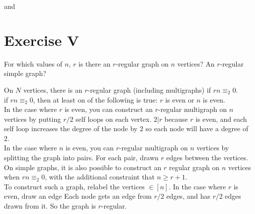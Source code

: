 \documentclass[fontsize=11pt]{scrartcl} %
\numberwithin{equation}{section} %
\numberwithin{figure}{section} %
\numberwithin{table}{section} %
\begin{document}
			and 
			
			

\section*{Exercise V}
 For which values of $n$, $r$ is there an $r$-regular graph on $n$ vertices? An
	$r$-regular simple graph?
	
	On $N$ vertices, there is an $r$-regular graph (including multigraphs) if $rn \equiv_2 0$.  \\
	
	if $rn \equiv_2 0$, then at least on of the following is true: $r$ is even or $n$ is even.  \\
	
	In the case where $r$ is even, you can construct an $r$-regular multigraph on $n$ vertices by putting $r/2$ self loops on each vertex.  $2|r$ because $r$ is even, and each self loop increases the degree of the node by $2$ so each node will have a degree of $2$.  \\
	
	In the case where $n$ is even, you can $r$-regular multigraph on $n$ vertices by splitting the graph into pairs.  For each pair, drawn $r$ edges between the vertices.  \\
	
	On simple graphs, it is also possible to construct an $r$ regular graph on $n$ vertices when $rn \equiv_2 0$, with the additional constraint that $n \geq r+1$.  \\
	
	To construct such a graph, relabel the vertices $\in [n]$.  In the case where $r$ is even, draw an edge Each node gets an edge from $r/2$ edges, and has $r/2$ edges drawn from it.  So the graph is $r$-regular.  \\
	
\end{document}
